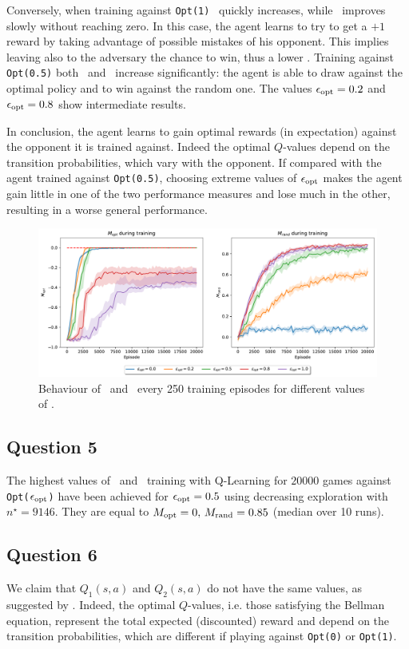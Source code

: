 \documentclass[10pt]{IEEEtran}
\begin{document}
Conversely, when training against \texttt{Opt(1)} \mrand\  quickly increases, while \mopt\  improves slowly without reaching zero. In this case, the agent learns to try to get a $+1$ reward by taking advantage of possible mistakes of his opponent. This implies leaving also to the adversary the chance to win, thus a lower \mopt.
Training against \texttt{Opt(0.5)} both \mopt\  and \mrand\  increase significantly: the agent is able to draw against the optimal policy and to win against the random one. The values $\epsilon_{\text{opt}} = 0.2$ and $\epsilon_{\text{opt}} = 0.8$ show intermediate results. 

In conclusion, the agent learns to gain optimal rewards (in expectation) against the opponent it is trained against. Indeed the optimal $Q$-values depend on the transition probabilities, which vary with the opponent. If compared with the agent trained against \texttt{Opt(0.5)}, choosing extreme values of $\epsilon_{\text{opt}}$ makes the agent gain little in one of the two performance measures and lose much in the other, resulting in a worse general performance.

\begin{figure}[h]
    \centering
    \includegraphics[width=\linewidth]{code/figures/performance_epsilon_opt.pdf}
    \caption{Behaviour of \mopt\  and \mrand\  every 250 training episodes for different values of \eopt.}
    \label{plot_question4}
\end{figure}

\subsection*{Question 5}
The highest values of \mopt\  and \mrand\  training with Q-Learning for $20000$ games against \texttt{Opt($\epsilon_{\text{opt}}$)} have been achieved for $\epsilon_{\text{opt}} = 0.5$ using decreasing exploration with $n^{\star} = 9146$. They are equal to $M_{\text{opt}} = 0, \, M_{\text{rand}} = 0.85$ (median over 10 runs).

\subsection*{Question 6}
We claim that $Q_1(s,a)$ and $Q_2(s,a)$ do not have the same values, as suggested by .
Indeed, the optimal $Q$-values, i.e. those satisfying the Bellman equation, represent the total expected (discounted) reward and depend on the transition probabilities, which are different if playing against \texttt{Opt(0)} or \texttt{Opt(1)}. 
\end{document}
